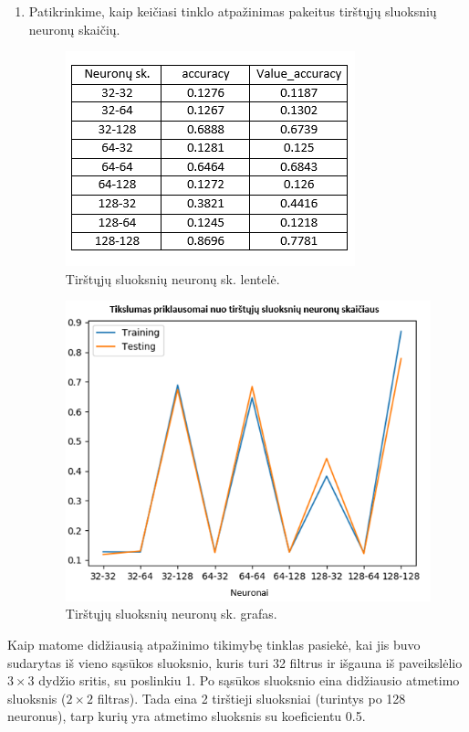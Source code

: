 \documentclass{VUMIFInfKursinis}
\begin{document}
\begin{enumerate}
    \newpage
    
    \item Patikrinkime, kaip keičiasi tinklo atpažinimas pakeitus tirštųjų sluoksnių neuronų skaičių.
    
    \begin{figure}[h!]
    \centering
    \includegraphics[scale=0.9]{img/DenseLayerTable}
    \caption{Tirštųjų sluoksnių neuronų sk. lentelė.}
    \label{fig:DenseTable}
    \end{figure}
    
    
    \begin{figure}[h!]
    \centering
    \includegraphics[scale=0.9]{img/DenseLayerGraph}
    \caption{Tirštųjų sluoksnių neuronų sk. grafas.}
    \label{fig:DenseGraph}
    \end{figure}

\end{enumerate}

Kaip matome didžiausią atpažinimo tikimybę tinklas pasiekė, kai jis buvo sudarytas iš vieno sąsūkos sluoksnio, kuris turi 32 filtrus ir išgauna iš paveikslėlio $3\times3$ dydžio sritis, su poslinkiu 1. Po sąsūkos sluoksnio eina didžiausio atmetimo sluoksnis ($2\times2$  filtras). Tada eina 2 tirštieji sluoksniai (turintys po 128 neuronus), tarp kurių yra atmetimo sluoksnis su koeficientu 0.5.
\end{document}
